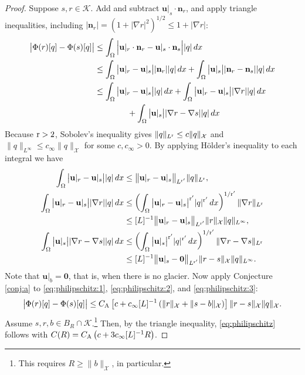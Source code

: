 \documentclass[hidelinks,onefignum,onetabnum,final]{siamart220329}  %
\newcommand{\grad}{\nabla}
\newcommand{\bn}{\mathbf{n}}
\newcommand{\bu}{\mathbf{u}}
\newcommand{\bzero}{\bm{0}}
\newcommand{\cK}{\mathcal{K}}
\newcommand{\cX}{\mathcal{X}}
\newcommand{\rr}{{\text{\textnormal{r}}}}
\newcommand{\CA}{C_\text{\textnormal{A}}}
\begin{document}
\begin{proof}  Suppose $s,r\in\cK$.  Add and subtract $\bu|_s \cdot \bn_r$, and apply triangle inequalities, including $|\bn_r|=\left(1+|\grad r|^2\right)^{1/2} \le 1 + |\grad r|$:
\begin{align}
\big|\Phi(r)[q] - \Phi(s)[q]\big| &\le \int_\Omega \Big|\bu|_r\cdot \bn_r - \bu|_s \cdot \bn_s\Big| |q|\,dx \\
    &\le \int_\Omega \big|\bu|_r - \bu|_s\big| |\bn_r| |q|\,dx + \int_\Omega \big|\bu|_s\big| |\bn_r-\bn_s| |q|\,dx \notag \\
    &\le \int_\Omega \big|\bu|_r - \bu|_s\big| |q|\,dx + \int_\Omega \big|\bu|_r - \bu|_s\big| |\grad r| |q|\,dx \notag \\
    &\qquad\qquad + \int_\Omega \big|\bu|_s\big| |\grad r-\grad s| |q|\,dx \notag
\end{align}
Because $\rr>2$, Sobolev's inequality gives $\|q\|_{L^{\rr}} \le c \|q\|_\cX$ and $\|q\|_{L^\infty} \le c_\infty \|q\|_\cX$ for some $c,c_\infty>0$.  By applying H\"older's inequality to each integral we have
\begin{align}
\int_\Omega \big|\bu|_r - \bu|_s\big| |q|\,dx &\le \big\|\bu|_r - \bu|_s\big\|_{L^{\rr'}} \|q\|_{L^{\rr}}, \label{eq:philipschitz:1} \\
\int_\Omega \big|\bu|_r - \bu|_s\big| |\grad r| |q|\,dx &\le \left(\int_\Omega \big|\bu|_r - \bu|_s\big|^{\rr'} |q|^{\rr'}\, dx\right)^{1/\rr'} \|\grad r\|_{L^\rr} \label{eq:philipschitz:2} \\
    &\le [L]^{-1} \big\|\bu|_r - \bu|_s\big\|_{L^{\rr'}} \|r\|_{\cX} \|q\|_{L^\infty}, \notag \\
\int_\Omega \big|\bu|_s\big| |\grad r-\grad s| |q|\,dx &\le \left(\int_\Omega \big|\bu|_s\big|^{\rr'} |q|^{\rr'}\, dx\right)^{1/\rr'} \|\grad r- \grad s\|_{L^\rr}  \label{eq:philipschitz:3} \\
    &\le [L]^{-1} \big\|\bu|_s - \bzero\big\|_{L^{\rr'}} \|r-s\|_{\cX} \|q\|_{L^\infty}. \notag
\end{align}
Note that $\bu|_b=\bzero$, that is, when there is no glacier.  Now apply Conjecture \ref{conj:a} to \eqref{eq:philipschitz:1}, \eqref{eq:philipschitz:2}, and \eqref{eq:philipschitz:3}:
\begin{equation}
\big|\Phi(r)[q] - \Phi(s)[q]\big| \le \CA \left[c + c_\infty [L]^{-1} \left(\|r\|_{\cX} + \|s - b\|_{\cX}\right)\right] \|r-s\|_{\cX} \|q\|_{\cX}.
\end{equation}
Assume $s,r,b\in B_R\cap \cK$.\footnote{This requires $R \ge \|b\|_\cX$, in particular.}  Then, by the triangle inequality, \eqref{eq:philipschitz} follows with $C(R) = \CA \left(c + 3 c_\infty [L]^{-1} R\right)$.
\end{proof}
\end{document}

